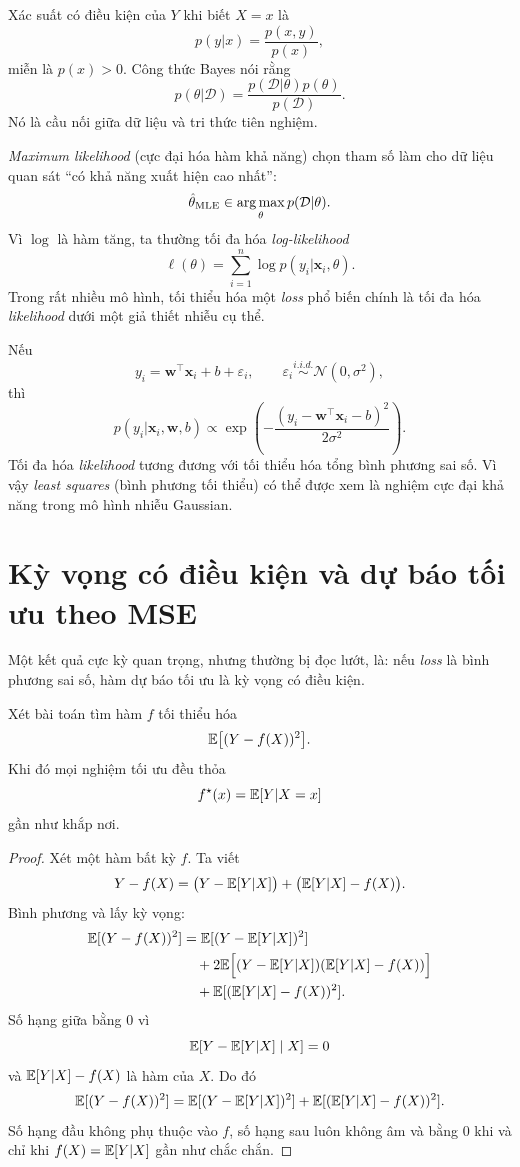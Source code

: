 Xác suất có điều kiện của $Y$ khi biết $X=x$ là
\[
p(y|x) = \frac{p(x,y)}{p(x)},
\]
miễn là $p(x)>0$. Công thức Bayes nói rằng
\[
p(\theta|\mathcal{D}) = \frac{p(\mathcal{D}|\theta)p(\theta)}{p(\mathcal{D})}.
\]
Nó là cầu nối giữa dữ liệu và tri thức tiên nghiệm.

\emph{Maximum likelihood} (cực đại hóa hàm khả năng) chọn tham số làm cho dữ liệu quan sát ``có khả năng xuất hiện cao nhất'':
\[
\hat{\theta}_{\mathrm{MLE}} \in \mathop{\mathrm{arg\,max}}_\theta p(\mathcal{D}|\theta).
\]
Vì \(\log\) là hàm tăng, ta thường tối đa hóa \emph{log-likelihood}
\[
\ell(\theta)=\sum_{i=1}^n \log p(y_i|\bm{x}_i,\theta).
\]
Trong rất nhiều mô hình, tối thiểu hóa một \emph{loss} phổ biến chính là tối đa hóa \emph{likelihood} dưới một giả thiết nhiễu cụ thể.

\begin{example}
Nếu
\[
y_i = \bm{w}^\top \bm{x}_i + b + \varepsilon_i,\qquad \varepsilon_i \stackrel{i.i.d.}{\sim}\mathcal{N}(0,\sigma^2),
\]
thì
\[
p(y_i|\bm{x}_i,\bm{w},b)
\propto
\exp\left(-\frac{(y_i-\bm{w}^\top \bm{x}_i-b)^2}{2\sigma^2}\right).
\]
Tối đa hóa \emph{likelihood} tương đương với tối thiểu hóa tổng bình phương sai số. Vì vậy \emph{least squares} (bình phương tối thiểu) có thể được xem là nghiệm cực đại khả năng trong mô hình nhiễu Gaussian.
\end{example}

\section{Kỳ vọng có điều kiện và dự báo tối ưu theo MSE}

Một kết quả cực kỳ quan trọng, nhưng thường bị đọc lướt, là: nếu \emph{loss} là bình phương sai số, hàm dự báo tối ưu là kỳ vọng có điều kiện.

\begin{theorem}
Xét bài toán tìm hàm $f$ tối thiểu hóa
\[
\mathbb{E}\big[(Y-f(X))^2\big].
\]
Khi đó mọi nghiệm tối ưu đều thỏa
\[
f^\star(x)=\mathbb{E}[Y|X=x]
\]
gần như khắp nơi.
\end{theorem}

\begin{proof}
Xét một hàm bất kỳ $f$. Ta viết
\[
Y-f(X) = \big(Y-\mathbb{E}[Y|X]\big) + \big(\mathbb{E}[Y|X]-f(X)\big).
\]
Bình phương và lấy kỳ vọng:
\begin{align*}
\mathbb{E}[(Y-f(X))^2]
&=
\mathbb{E}[(Y-\mathbb{E}[Y|X])^2] \\
&\quad + 2\mathbb{E}\Big[(Y-\mathbb{E}[Y|X])(\mathbb{E}[Y|X]-f(X))\Big] \\
&\quad + \mathbb{E}[(\mathbb{E}[Y|X]-f(X))^2].
\end{align*}
Số hạng giữa bằng 0 vì
\[
\mathbb{E}[Y-\mathbb{E}[Y|X]\mid X]=0
\]
và \(\mathbb{E}[Y|X]-f(X)\) là hàm của \(X\). Do đó
\[
\mathbb{E}[(Y-f(X))^2]
=
\mathbb{E}[(Y-\mathbb{E}[Y|X])^2] + \mathbb{E}[(\mathbb{E}[Y|X]-f(X))^2].
\]
Số hạng đầu không phụ thuộc vào $f$, số hạng sau luôn không âm và bằng 0 khi và chỉ khi $f(X)=\mathbb{E}[Y|X]$ gần như chắc chắn.
\end{proof}

